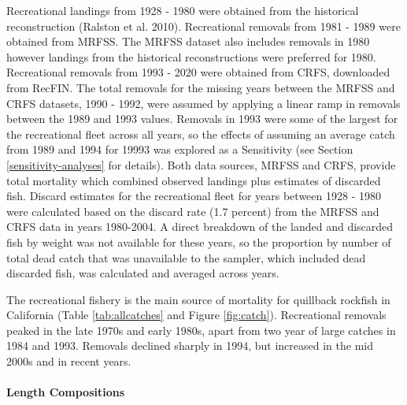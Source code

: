 \documentclass[11pt,
  english,
  a4paper,
]{article}
\begin{document}
Recreational landings from 1928 - 1980 were obtained from the historical reconstruction {(Ralston et al. 2010)\leavevmode\tagmcend\tagstructend}. Recreational removals from 1981 - 1989 were obtained from MRFSS. The MRFSS dataset also includes removals in 1980 however landings from the historical reconstructions were preferred for 1980. Recreational removals from 1993 - 2020 were obtained from CRFS, downloaded from RecFIN. The total removals for the missing years between the MRFSS and CRFS datasets, 1990 - 1992, were assumed by applying a linear ramp in removals between the 1989 and 1993 values. Removals in 1993 were some of the largest for the recreational fleet across all years, so the effects of assuming an average catch from 1989 and 1994 for 19993 was explored as a Sensitivity (see Section \ref{sensitivity-analyses} for details). Both data sources, MRFSS and CRFS, provide total mortality which combined observed landings plus estimates of discarded fish. Discard estimates for the recreational fleet for years between 1928 - 1980 were calculated based on the discard rate (1.7 percent) from the MRFSS and CRFS data in years 1980-2004. A direct breakdown of the landed and discarded fish by weight was not available for these years, so the proportion by number of total dead catch that was unavailable to the sampler, which included dead discarded fish, was calculated and averaged across years.

\leavevmode\tagmcend\tagstructend\par


The recreational fishery is the main source of mortality for quillback rockfish in California (Table \ref{tab:allcatches} and Figure \ref{fig:catch}). Recreational removals peaked in the late 1970s and early 1980s, apart from two year of large catches in 1984 and 1993. Removals declined sharply in 1994, but increased in the mid 2000s and in recent years.

\leavevmode\tagmcend\tagstructend\par


\hypertarget{length-compositions-1}{%
\paragraph{Length Compositions}\label{length-compositions-1}}
\end{document}
